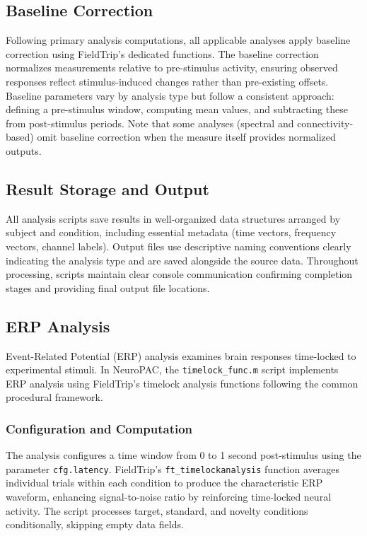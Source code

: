 \documentclass[12pt]{report}
\begin{document}
\subsection{Baseline Correction}

Following primary analysis computations, all applicable analyses apply baseline correction using FieldTrip's dedicated functions. The baseline correction normalizes measurements relative to pre-stimulus activity, ensuring observed responses reflect stimulus-induced changes rather than pre-existing offsets. Baseline parameters vary by analysis type but follow a consistent approach: defining a pre-stimulus window, computing mean values, and subtracting these from post-stimulus periods. Note that some analyses (spectral and connectivity-based) omit baseline correction when the measure itself provides normalized outputs.

\subsection{Result Storage and Output}

All analysis scripts save results in well-organized data structures arranged by subject and condition, including essential metadata (time vectors, frequency vectors, channel labels). Output files use descriptive naming conventions clearly indicating the analysis type and are saved alongside the source data. Throughout processing, scripts maintain clear console communication confirming completion stages and providing final output file locations.

\subsection{ERP Analysis}

Event-Related Potential (ERP) analysis examines brain responses time-locked to experimental stimuli. In NeuroPAC, the \verb|timelock_func.m| script implements ERP analysis using FieldTrip's timelock analysis functions following the common procedural framework.

\subsubsection{Configuration and Computation}

The analysis configures a time window from 0 to 1 second post-stimulus using the parameter \verb|cfg.latency|. FieldTrip's \verb|ft_timelockanalysis| function averages individual trials within each condition to produce the characteristic ERP waveform, enhancing signal-to-noise ratio by reinforcing time-locked neural activity. The script processes target, standard, and novelty conditions conditionally, skipping empty data fields.
\end{document}
